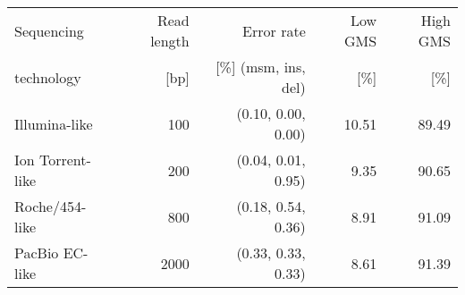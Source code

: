     \begin{tabular}{lrrrr}
    \toprule
    Sequencing                 & Read length   & Error rate & Low GMS          & High GMS \\
    technology                 & [bp]          & [\%] (msm, ins, del) & [\%]             & [\%] \\
    \midrule
    Illumina-like              & 100           & (0.10, 0.00, 0.00) & 10.51            & 89.49      \\
    Ion Torrent-like           & 200           & (0.04, 0.01, 0.95) & 9.35  & 90.65      \\
    Roche/454-like             & 800           & (0.18, 0.54, 0.36) & 8.91  & 91.09      \\
	PacBio EC-like             & 2000          & (0.33, 0.33, 0.33) & 8.61  & 91.39      \\
    \bottomrule
    \end{tabular}